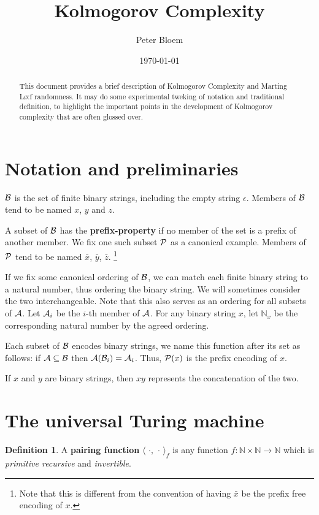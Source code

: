 \documentclass{article}
\title{Kolmogorov Complexity}
\date{\today}
\author{Peter Bloem}
\theoremstyle{definition}
\newtheorem*{dfn}{Definition}
\begin{document}
\maketitle

\begin{abstract}
\noindent This document provides a brief description of Kolmogorov Complexity and Marting L\o:f randomness. It may do some experimental tweking of notation and traditional definition, to highlight the important points in the development of Kolmogorov complexity that are often glossed over.
\end{abstract}

\section*{Notation and preliminaries}

$\cal{B}$ is the set of finite binary strings, including the empty string $\epsilon$. Members of $\cal B$ tend to be named $x$, $y$ and $z$.

A subset of $\cal B$ has the \textbf{prefix-property} if no member of the set is a prefix of another member. We fix one such subset $\cal P$ as a canonical example. Members of $\cal{P}$ tend to be named $\bar{x}$, $\bar{y}$, $\bar{z}$. \footnote{Note that this is different from the convention of having $\bar{x}$ be the prefix free encoding of $x$.} 

If we fix some canonical ordering of $\cal B$, we can match each finite binary string to a natural number, thus ordering the binary string. We will sometimes consider the two interchangeable. Note that this also serves as an ordering for all subsets of $\cal A$. Let ${\cal A}_i$ be the $i$-th member of $\cal A$. For any binary string $x$, let ${\mathbb N}_x$ be the corresponding natural number by the agreed ordering.

Each subset of $\cal{B}$ encodes binary strings, we name this function after its set as follows: if ${\cal A} \subseteq {\cal B}$ then ${\cal A}({\cal B}_i) = {\cal A}_i$. Thus, ${\cal P}(x)$ is the prefix encoding of $x$.

If $x$ and $y$ are binary strings, then $xy$ represents the concatenation of the two.

\section*{The universal Turing machine}

\begin{dfn}
A \textbf{pairing function} $\langle\,\,\cdot,\,\cdot\,\rangle_f$ is any function $f: \mathbb{N} \times \mathbb{N} \rightarrow \mathbb{N}$ which is \emph{primitive recursive} and \emph{invertible}.
\end{dfn}
\end{document}
